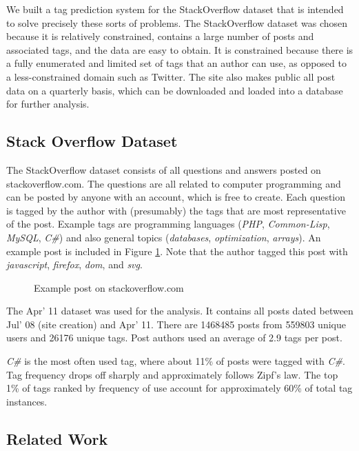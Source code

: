 \documentclass[10pt,letterpaper]{article}
\begin{document}
We built a tag prediction system for the StackOverflow dataset that is intended to solve precisely these sorts of problems.
The StackOverflow dataset was chosen because it is relatively constrained, contains a large number of posts and associated tags, and the data are easy to obtain.
It is constrained because there is a fully enumerated and limited set of tags that an author can use, as opposed to a less-constrained domain such as Twitter.
The site also makes public all post data on a quarterly basis, which can be downloaded and loaded into a database for further analysis.

\subsection{Stack Overflow Dataset}

The StackOverflow dataset consists of all questions and answers posted on stackoverflow.com.
The questions are all related to computer programming and can be posted by anyone with an account, which is free to create.
Each question is tagged by the author with (presumably) the tags that are most representative of the post.
Example tags are programming languages (\emph{PHP}, \emph{Common-Lisp}, \emph{MySQL}, \emph{C\#}) and also general topics (\emph{databases}, \emph{optimization}, \emph{arrays}).
An example post is included in Figure \ref{fig:examplePost}.
Note that the author tagged this post with \emph{javascript}, \emph{firefox}, \emph{dom}, and \emph{svg}.

\begin{figure}[ht]
  \centering
  \caption{Example post on stackoverflow.com}
  \label{fig:examplePost}
\end{figure}

The Apr' 11 dataset \cite{DataDump2011} was used for the analysis.
It contains all posts dated between Jul' 08 (site creation) and Apr' 11.
There are \num{1468485} posts from \num{559803} unique users and \num{26176} unique tags.
Post authors used an average of 2.9 tags per post.

\emph{C\#} is the most often used tag, where about 11\% of posts were tagged with \emph{C\#}.
Tag frequency drops off sharply and approximately follows Zipf's law.
The top 1\% of tags ranked by frequency of use account for approximately 60\% of total tag instances.

\subsection{Related Work}
\end{document}

